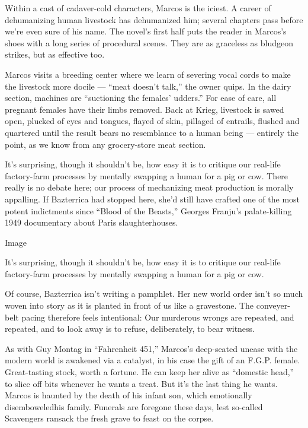 Within a cast of cadaver-cold characters, Marcos is the iciest. A career
of dehumanizing human livestock has dehumanized him; several chapters
pass before we're even sure of his name. The novel's first half puts the
reader in Marcos's shoes with a long series of procedural scenes. They
are as graceless as bludgeon strikes, but as effective too.

Marcos visits a breeding center where we learn of severing vocal cords
to make the livestock more docile --- ``meat doesn't talk,'' the owner
quips. In the dairy section, machines are ``suctioning the females'
udders.'' For ease of care, all pregnant females have their limbs
removed. Back at Krieg, livestock is sawed open, plucked of eyes and
tongues, flayed of skin, pillaged of entrails, flushed and quartered
until the result bears no resemblance to a human being --- entirely the
point, as we know from any grocery-store meat section.

It's surprising, though it shouldn't be, how easy it is to critique our
real-life factory-farm processes by mentally swapping a human for a pig
or cow. There really is no debate here; our process of mechanizing meat
production is morally appalling. If Bazterrica had stopped here, she'd
still have crafted one of the most potent indictments since ``Blood of
the Beasts,'' Georges Franju's palate-killing 1949 documentary about
Paris slaughterhouses.

Image

It's surprising, though it shouldn't be, how easy it is to critique our
real-life factory-farm processes by mentally swapping a human for a pig
or cow.

Of course, Bazterrica isn't writing a pamphlet. Her new world order
isn't so much woven into story as it is planted in front of us like a
gravestone. The conveyer-belt pacing therefore feels intentional: Our
murderous wrongs are repeated, and repeated, and to look away is to
refuse, deliberately, to bear witness.

As with Guy Montag in ``Fahrenheit 451,'' Marcos's deep-seated unease
with the modern world is awakened via a catalyst, in his case the gift
of an F.G.P. female. Great-tasting stock, worth a fortune. He can keep
her alive as ``domestic head,'' to slice off bits whenever he wants a
treat. But it's the last thing he wants. Marcos is haunted by the death
of his infant son, which emotionally disemboweledhis family. Funerals
are foregone these days, lest so-called Scavengers ransack the fresh
grave to feast on the corpse.

